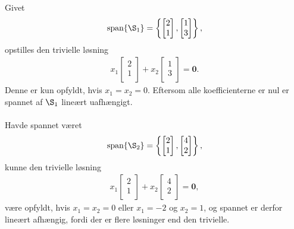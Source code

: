 \begin{eks}\label{fisk}
Givet
\begin{align*}
\text{span}\{\S_1 \} =
\left\{ 
\begin{bmatrix}
           2 \\
           1 \\
\end{bmatrix} 
,
\begin{bmatrix}
           1 \\
           3 \\
\end{bmatrix}
\right\},
\end{align*}
opstilles den trivielle løsning  
%
\begin{align*}
x_1 
\begin{bmatrix}
           2 \\
           1 \\
\end{bmatrix} 
+ x_2
\begin{bmatrix}
           1 \\
           3 \\
\end{bmatrix}
= \mathbf{0}.
\end{align*}
%
Denne er kun opfyldt, hvis $x_1=x_2=0$. 
Eftersom alle koefficienterne er nul er spannet af $\S_1$ lineært uafhængigt.
\\\\
Havde spannet været 
\begin{align*}
\text{span}\{\S_2 \} =
\left\{ 
\begin{bmatrix}
           2 \\
           1 \\
\end{bmatrix} 
,
\begin{bmatrix}
           4 \\
           2 \\
\end{bmatrix}
\right\},
\end{align*}
%
kunne den trivielle løsning 
%
\begin{align*}
x_1 
\begin{bmatrix}
           2 \\
           1 \\
\end{bmatrix} 
+ x_2
\begin{bmatrix}
           4 \\
           2 \\
\end{bmatrix}
= \mathbf{0},
\end{align*}
%
være opfyldt, hvis $x_1=x_2=0$ eller $x_1=-2$ og $x_2=1$, og spannet er derfor lineært afhængig, fordi der er flere løsninger end den trivielle.
%
\end{eks}
